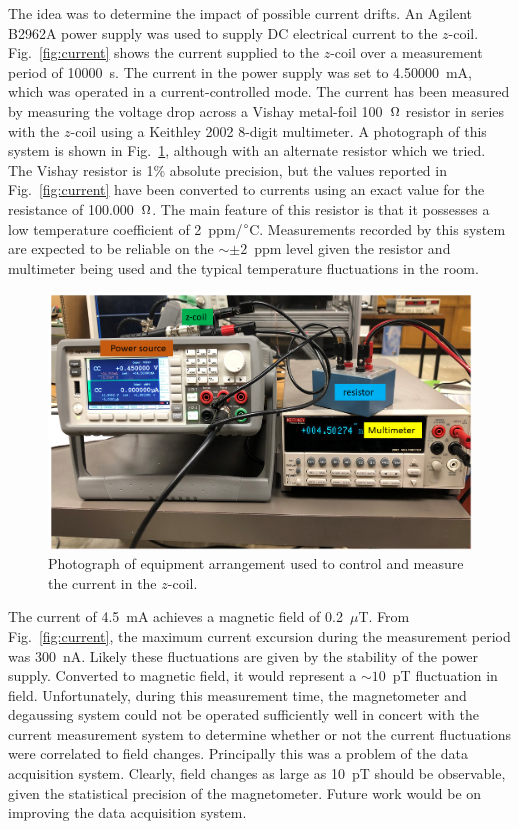 The idea was to determine the impact of possible current drifts.  An
Agilent B2962A power supply was used to supply DC electrical current
to the $z$-coil.  Fig.~\ref{fig:current} shows the current supplied to
the $z$-coil over a measurement period of 10000~s.  The current in the
power supply was set to 4.50000~mA, which was operated in a
current-controlled mode.  The current has been measured by measuring
the voltage drop across a Vishay metal-foil 100~$\ohm$ resistor in
series with the $z$-coil using a Keithley 2002 8-digit multimeter.  A
photograph of this system is shown in
Fig.~\ref{fig:Current_study_setup}, although with an alternate
resistor which we tried.  The Vishay resistor is 1\% absolute
precision, but the values reported in Fig.~\ref{fig:current} have been
converted to currents using an exact value for the resistance of
100.000~$\ohm$.  The main feature of this resistor is that it
possesses a low temperature coefficient of 2~ppm/$\degree$C.
Measurements recorded by this system are expected to be reliable on
the $\sim\pm 2$~ppm level given the resistor and multimeter being used
and the typical temperature fluctuations in the room.


\begin{figure}%
\centering
\includegraphics[width=\linewidth]{figures/current_study_setup.png}
\caption{Photograph of equipment arrangement used to control and
  measure the current in the $z$-coil.\label{fig:Current_study_setup}}
\end{figure}

The current of 4.5~mA achieves a magnetic field of 0.2~$\mu$T.  From
Fig.~\ref{fig:current}, the maximum current excursion during the
measurement period was 300~nA.  Likely these fluctuations are given by
the stability of the power supply. Converted to magnetic field, it
would represent a $\sim 10$~pT fluctuation in field.  Unfortunately,
during this measurement time, the magnetometer and degaussing system
could not be operated sufficiently well in concert with the current
measurement system to determine whether or not the current
fluctuations were correlated to field changes.  Principally this was a
problem of the data acquisition system.  Clearly, field changes as
large as 10~pT should be observable, given the statistical precision
of the magnetometer.  Future work would be on improving the data
acquisition system.

